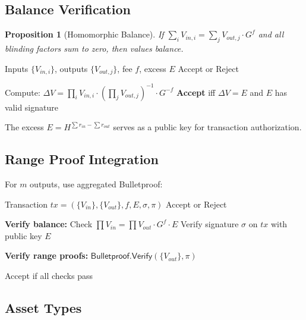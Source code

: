 \documentclass[11pt,a4paper]{article}
\newtheorem{proposition}[theorem]{Proposition}
\begin{document}
\subsection{Balance Verification}

\begin{proposition}[Homomorphic Balance]
If $\sum_i V_{in,i} = \sum_j V_{out,j} \cdot G^f$ and all blinding factors sum to zero, then values balance.
\end{proposition}

\begin{algorithm}
\caption{Balance Check}
\label{alg:balance}
\begin{algorithmic}[1]
\Require Inputs $\{V_{in,i}\}$, outputs $\{V_{out,j}\}$, fee $f$, excess $E$
\Ensure Accept or Reject

\State Compute: $\Delta V = \prod_i V_{in,i} \cdot (\prod_j V_{out,j})^{-1} \cdot G^{-f}$
\State \textbf{Accept} iff $\Delta V = E$ and $E$ has valid signature
\end{algorithmic}
\end{algorithm}

The excess $E = H^{\sum r_{in} - \sum r_{out}}$ serves as a public key for transaction authorization.

\subsection{Range Proof Integration}

For $m$ outputs, use aggregated Bulletproof:

\begin{algorithm}
\caption{Confidential Transaction Verification}
\label{alg:ct-verify}
\begin{algorithmic}[1]
\Require Transaction $tx = (\{V_{in}\}, \{V_{out}\}, f, E, \sigma, \pi)$
\Ensure Accept or Reject

\State \textbf{Verify balance:}
\State Check $\prod V_{in} = \prod V_{out} \cdot G^f \cdot E$
\State Verify signature $\sigma$ on $tx$ with public key $E$

\State \textbf{Verify range proofs:}
\State $\mathsf{Bulletproof.Verify}(\{V_{out}\}, \pi)$

\State \Return Accept if all checks pass
\end{algorithmic}
\end{algorithm}

\subsection{Asset Types}
\end{document}
